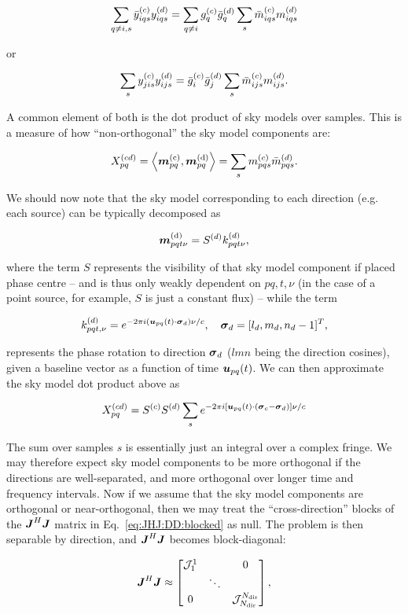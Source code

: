 \documentclass[useAMS,usenatbib]{mn2e}
\newcommand{\mat}[1]{{\bmath{#1}}}
\newcommand{\JJ}{\mat{J}} %
\newcommand{\JHJ}{\JJ^H\JJ} %
\begin{document}
\[
  \sum\limits_{q\ne i,s} \bar{y}^{(c)}_{iqs} y^{(d)}_{iqs} = \sum\limits_{q\ne i} g^{(c)}_q \bar{g}^{(d)}_q \sum_s \bar{m}^{(c)}_{iqs} m^{(d)}_{iqs}
\]

or

\[
  \sum\limits_{s} y^{(c)}_{jis} y^{(d)}_{ijs} = \bar{g}^{(c)}_i \bar{g}^{(d)}_j \sum_s \bar{m}^{(c)}_{ijs} m^{(d)}_{ijs}.
\]

A common element of both is the dot product of sky models over samples. This is a measure of how ``non-orthogonal'' the 
sky model components are:

\begin{equation}
\label{eq:Xpqcd}
X_{pq}^{(cd)} = \left \langle \bmath{m}_{pq}^\mathrm{(c)},\bmath{m}^\mathrm{(d)}_{pq} \right \rangle = \sum_s \mmc_{pqs} \mmdH_{pqs}.
\end{equation}

We should now note that the sky model corresponding to each direction (e.g. each source) can be typically decomposed as

\[
\bmath{m}_{pqt\nu}^\mathrm{(d)} = S^{(d)} k^{(d)}_{pqt\nu}, 
\]

where the term $S$ represents the visibility of that sky model component if placed phase centre -- and is thus only 
weakly dependent on $pq,t,\nu$ (in the case of a point source, for example, $S$ is just a constant flux) -- while the term

\[
k^{(d)}_{pqt,\nu} = e^{-2\pi i (\bmath{u}_{pq}(t)\cdot\bmath{\sigma}_d)\nu/c},~~~\bmath{\sigma}_d = [l_d,m_d,n_d-1]^T,
\]

represents the phase rotation to direction $\bmath{\sigma}_d$ ($lmn$ being the direction cosines), given a 
baseline vector as a function of time $\bmath{u}_{pq}(t)$. We can then approximate the sky model dot product above as

\[
X_{pq}^{(cd)} = S^{(c)}S^{(d)} \sum_s e^{-2\pi i [\bmath{u}_{pq}(t)\cdot(\bmath{\sigma}_c-\bmath{\sigma}_d) ]\nu/c}
\]

The sum over samples $s$ is essentially just an integral over a complex fringe. We may therefore expect sky model 
components to be more orthogonal if the directions are well-separated, and more orthogonal over longer time and
frequency intervals. Now if we assume that the sky model components are orthogonal or near-orthogonal, then
we may treat the ``cross-direction'' blocks of the $\JHJ$ matrix in Eq.~\ref{eq:JHJ:DD:blocked} as null. The problem is 
then separable by direction, and $\JHJ$ becomes block-diagonal:


\begin{equation}
\label{eq:JHJ:DD:block-diag}
\JHJ \approx \Matrix{ccc}{\JJJ^1_1 &  & 0 \\
& \ddots &  \\
0 & & \JJJ_{\Nd}^{\Nd} },
\end{equation}
\end{document}
